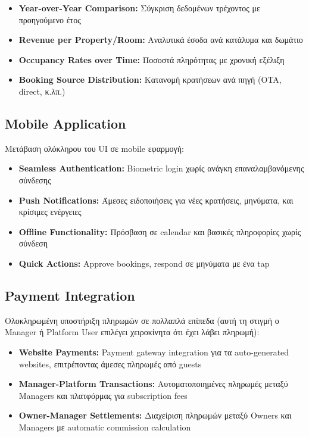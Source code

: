 \documentclass[
	12pt, %
	oneside, %
	greek,
	onehalfspacing, %
	liststotoc, %
	toctotoc, %
	parskip, %
	headsepline, %
]{MastersDoctoralThesis} %
\begin{document}
\begin{itemize}
    \item \textbf{Year-over-Year Comparison:} Σύγκριση δεδομένων τρέχοντος με προηγούμενο έτος
    \item \textbf{Revenue per Property/Room:} Αναλυτικά έσοδα ανά κατάλυμα και δωμάτιο
    \item \textbf{Occupancy Rates over Time:} Ποσοστά πληρότητας με χρονική εξέλιξη
    \item \textbf{Booking Source Distribution:} Κατανομή κρατήσεων ανά πηγή (OTA, direct, κ.λπ.)
\end{itemize}

\subsection{Mobile Application}

Μετάβαση ολόκληρου του UI σε mobile εφαρμογή:

\begin{itemize}
    \item \textbf{Seamless Authentication:} Biometric login χωρίς ανάγκη επαναλαμβανόμενης σύνδεσης
    \item \textbf{Push Notifications:} Άμεσες ειδοποιήσεις για νέες κρατήσεις, μηνύματα, και κρίσιμες ενέργειες
    \item \textbf{Offline Functionality:} Πρόσβαση σε calendar και βασικές πληροφορίες χωρίς σύνδεση
    \item \textbf{Quick Actions:} Approve bookings, respond σε μηνύματα με ένα tap
\end{itemize}

\subsection{Payment Integration}
\label{subsec:payment-integration}

Ολοκληρωμένη υποστήριξη πληρωμών σε πολλαπλά επίπεδα (αυτή τη στιγμή ο Manager ή Platform User επιλέγει χειροκίνητα ότι έχει λάβει πληρωμή):

\begin{itemize}
    \item \textbf{Website Payments:} Payment gateway integration για τα auto-generated websites, επιτρέποντας άμεσες πληρωμές από guests
    \item \textbf{Manager-Platform Transactions:} Αυτοματοποιημένες πληρωμές μεταξύ Managers και πλατφόρμας για subscription fees
    \item \textbf{Owner-Manager Settlements:} Διαχείριση πληρωμών μεταξύ Owners και Managers με automatic commission calculation
\end{itemize}
\end{document}
